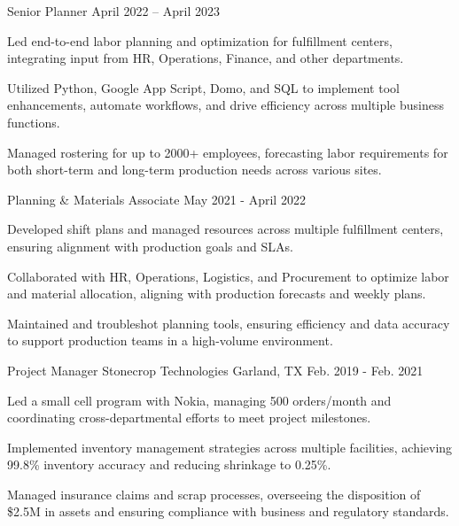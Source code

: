\begin{cventries}
\cventry
  {Senior Planner} %
  {} %
  {} %
  {April 2022 – April 2023} %
  {
    \begin{cvitems} %
      \item {Led end-to-end labor planning and optimization for fulfillment centers, integrating input from HR, Operations, Finance, and other departments.}
      \item {Utilized Python, Google App Script, Domo, and SQL to implement tool enhancements, automate workflows, and drive efficiency across multiple business functions.}
      \item {Managed rostering for up to 2000+ employees, forecasting labor requirements for both short-term and long-term production needs across various sites.}
    \end{cvitems}
  }

\cventry
  {Planning \& Materials Associate} %
  {} %
  {} %
  {May 2021 - April 2022} %
  {
    \begin{cvitems} %
      \item {Developed shift plans and managed resources across multiple fulfillment centers, ensuring alignment with production goals and SLAs.}
      \item {Collaborated with HR, Operations, Logistics, and Procurement to optimize labor and material allocation, aligning with production forecasts and weekly plans.}
      \item {Maintained and troubleshot planning tools, ensuring efficiency and data accuracy to support production teams in a high-volume environment.}
    \end{cvitems}
  }

\vspace{0.4cm}
\cventry
  {Project Manager} %
  {Stonecrop Technologies} %
  {Garland, TX} %
  {Feb. 2019 - Feb. 2021} %
  {
    \begin{cvitems} %
      \item {Led a small cell program with Nokia, managing 500 orders/month and coordinating cross-departmental efforts to meet project milestones.}
      \item {Implemented inventory management strategies across multiple facilities, achieving 99.8\% inventory accuracy and reducing shrinkage to 0.25\%.}
      \item {Managed insurance claims and scrap processes, overseeing the disposition of \$2.5M in assets and ensuring compliance with business and regulatory standards.}
    \end{cvitems}
  }


\end{cventries}
